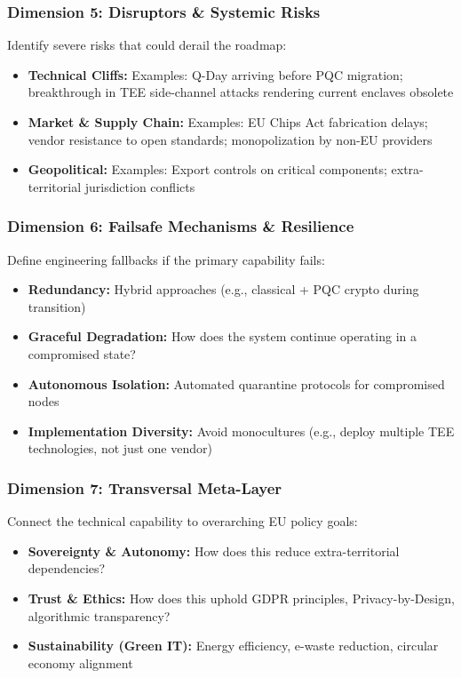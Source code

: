 \documentclass[12pt,a4paper]{article}
\begin{document}
\subsubsection*{Dimension 5: Disruptors \& Systemic Risks}
Identify severe risks that could derail the roadmap:
\begin{itemize}
    \item \textbf{Technical Cliffs:} Examples: Q-Day arriving before PQC migration; breakthrough in TEE side-channel attacks rendering current enclaves obsolete
    \item \textbf{Market \& Supply Chain:} Examples: EU Chips Act fabrication delays; vendor resistance to open standards; monopolization by non-EU providers
    \item \textbf{Geopolitical:} Examples: Export controls on critical components; extra-territorial jurisdiction conflicts
\end{itemize}

\subsubsection*{Dimension 6: Failsafe Mechanisms \& Resilience}
Define engineering fallbacks if the primary capability fails:
\begin{itemize}
    \item \textbf{Redundancy:} Hybrid approaches (e.g., classical + PQC crypto during transition)
    \item \textbf{Graceful Degradation:} How does the system continue operating in a compromised state?
    \item \textbf{Autonomous Isolation:} Automated quarantine protocols for compromised nodes
    \item \textbf{Implementation Diversity:} Avoid monocultures (e.g., deploy multiple TEE technologies, not just one vendor)
\end{itemize}

\subsubsection*{Dimension 7: Transversal Meta-Layer}
Connect the technical capability to overarching EU policy goals:
\begin{itemize}
    \item \textbf{Sovereignty \& Autonomy:} How does this reduce extra-territorial dependencies?
    \item \textbf{Trust \& Ethics:} How does this uphold GDPR principles, Privacy-by-Design, algorithmic transparency?
    \item \textbf{Sustainability (Green IT):} Energy efficiency, e-waste reduction, circular economy alignment
\end{itemize}
\end{document}

